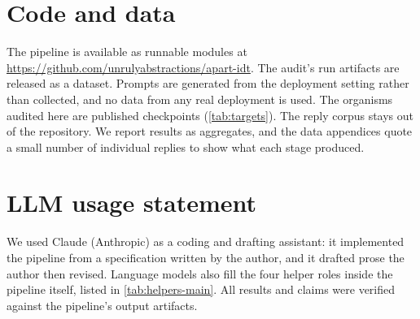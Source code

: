 \section{Code and data}
\label{sec:code-and-data}

The pipeline is available as runnable modules at \url{https://github.com/unrulyabstractions/apart-idt}.
The audit's run artifacts are released as a dataset.
Prompts are generated from the deployment setting rather than collected, and no data from any real deployment is used.
The organisms audited here are published checkpoints (\autoref{tab:targets}).
The reply corpus stays out of the repository.
We report results as aggregates, and the data appendices quote a small number of individual replies to show what each stage produced.

\section*{LLM usage statement}

We used Claude (Anthropic) as a coding and drafting assistant: it implemented the pipeline from a specification written by the author, and it drafted prose the author then revised.
Language models also fill the four helper roles inside the pipeline itself, listed in \autoref{tab:helpers-main}.
All results and claims were verified against the pipeline's output artifacts.
